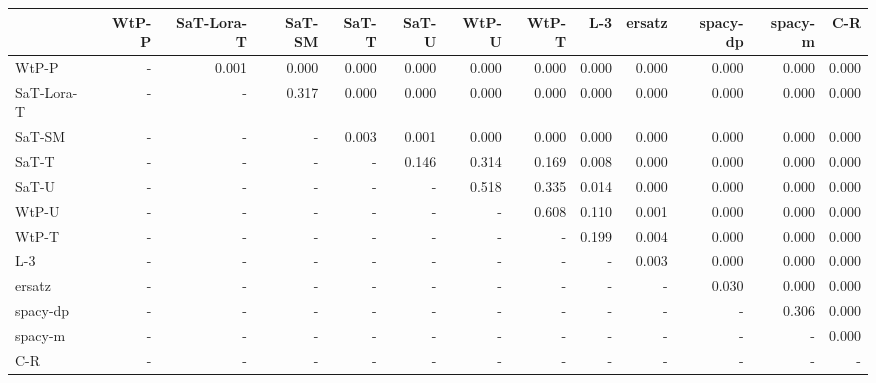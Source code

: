 \begin{tabular}{lrrrrrrrrrrrr}
\toprule
 & WtP-P & SaT-Lora-T & SaT-SM & SaT-T & SaT-U & WtP-U & WtP-T & L-3 & ersatz & spacy-dp & spacy-m & C-R \\
\midrule
WtP-P & - & 0.001 & 0.000 & 0.000 & 0.000 & 0.000 & 0.000 & 0.000 & 0.000 & 0.000 & 0.000 & 0.000 \\
SaT-Lora-T & - & - & 0.317 & 0.000 & 0.000 & 0.000 & 0.000 & 0.000 & 0.000 & 0.000 & 0.000 & 0.000 \\
SaT-SM & - & - & - & 0.003 & 0.001 & 0.000 & 0.000 & 0.000 & 0.000 & 0.000 & 0.000 & 0.000 \\
SaT-T & - & - & - & - & 0.146 & 0.314 & 0.169 & 0.008 & 0.000 & 0.000 & 0.000 & 0.000 \\
SaT-U & - & - & - & - & - & 0.518 & 0.335 & 0.014 & 0.000 & 0.000 & 0.000 & 0.000 \\
WtP-U & - & - & - & - & - & - & 0.608 & 0.110 & 0.001 & 0.000 & 0.000 & 0.000 \\
WtP-T & - & - & - & - & - & - & - & 0.199 & 0.004 & 0.000 & 0.000 & 0.000 \\
L-3 & - & - & - & - & - & - & - & - & 0.003 & 0.000 & 0.000 & 0.000 \\
ersatz & - & - & - & - & - & - & - & - & - & 0.030 & 0.000 & 0.000 \\
spacy-dp & - & - & - & - & - & - & - & - & - & - & 0.306 & 0.000 \\
spacy-m & - & - & - & - & - & - & - & - & - & - & - & 0.000 \\
C-R & - & - & - & - & - & - & - & - & - & - & - & - \\
\bottomrule
\end{tabular}

